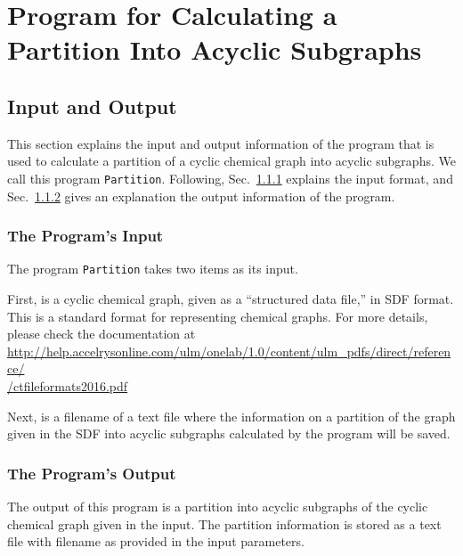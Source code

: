 \documentclass[11pt,titlepage,dvipdfmx,twoside]{article}
\begin{document}
\section{Program for Calculating a Partition Into Acyclic Subgraphs}
\label{sec: partition}

\subsection{Input and Output}
\label{sec:InOut_p}

This section explains the input and output information of the 
program that is used to calculate a partition of a cyclic chemical graph
into acyclic subgraphs.
We call this program {\tt Partition}.
Following,
Sec.~\ref{sec:Input_p} explains the input format, and
Sec.~\ref{sec:Output_p} gives an explanation the output information of the program.


\subsubsection{The Program's Input}
\label{sec:Input_p}


The program {\tt Partition} takes two items as its input.

First, is a cyclic chemical graph, given as a ``structured data file,'' in  SDF format.
This is a standard format for representing chemical graphs.
For more details, please check the documentation at \\
\url{ http://help.accelrysonline.com/ulm/onelab/1.0/content/ulm_pdfs/direct/reference/} \\
\url{/ctfileformats2016.pdf} 

Next,  is a filename of a text file where the information on 
a partition of the graph given in the SDF into acyclic subgraphs
calculated by the program will be saved.


\subsubsection{The Program's Output}
\label{sec:Output_p}

The output of this program is a 
partition into acyclic subgraphs of the cyclic chemical graph given in
the input.
The partition information is stored as a text file with filename as provided
in the input parameters.
\end{document}
